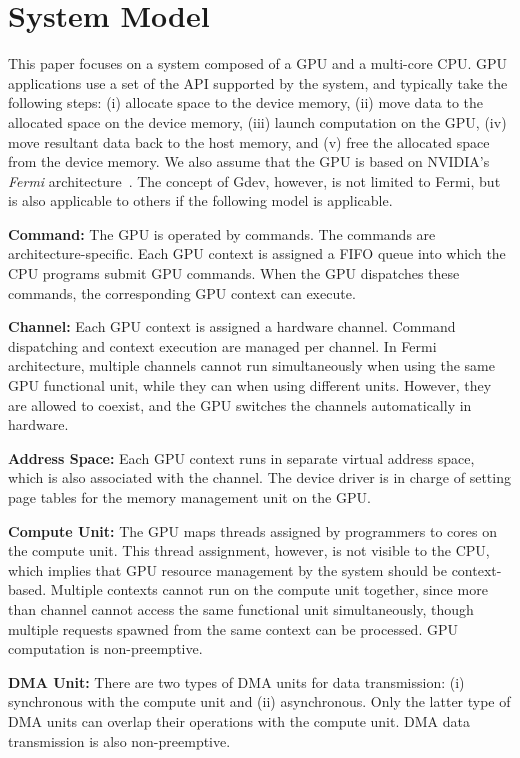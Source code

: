 \section{System Model}
\label{sec:model}
\vspace{-0.25em}

This paper focuses on a system composed of a GPU and a multi-core CPU.
GPU applications use a set of the API supported by the system, and
typically take the following steps:
(i) allocate space to the device memory, 
(ii) move data to the allocated space on the device memory, 
(iii) launch computation on the GPU, 
(iv) move resultant data back to the host memory, and 
(v) free the allocated space from the device memory.
We also assume that the GPU is based on NVIDIA's \textit{Fermi}
architecture~\cite{Fermi}.
The concept of Gdev, however, is not limited to Fermi, but is also
applicable to others if the following model is applicable.

\textbf{Command:}
The GPU is operated by commands.
The commands are architecture-specific.
Each GPU context is assigned a FIFO queue into which the CPU programs
submit GPU commands.
When the GPU dispatches these commands, the corresponding GPU context
can execute.

\textbf{Channel:}
Each GPU context is assigned a hardware channel.
Command dispatching and context execution are managed per channel.
In Fermi architecture, multiple channels cannot run simultaneously when
using the same GPU functional unit, while they can when using different
units.
However, they are allowed to coexist, and the GPU switches the channels
automatically in hardware.

\textbf{Address Space:}
Each GPU context runs in separate virtual address space, which is also
associated with the channel.
The device driver is in charge of setting page tables for the memory
management unit on the GPU.

\begin{comment}
\textbf{I/O Register:}
The GPU provides a bunch of memory-mapped I/O registers per context
visible to the device driver through the (PCI) I/O bus.
The device driver needs to manage these registers to send commands and
set up channels and address space.
\end{comment}

\textbf{Compute Unit:}
The GPU maps threads assigned by programmers to cores on the compute unit.
This thread assignment, however, is not visible to the CPU, which
implies that GPU resource management by the system should be
context-based. 
Multiple contexts cannot run on the compute unit together, since
more than channel cannot access the same functional unit simultaneously,
though multiple requests spawned from the same context can be processed.
GPU computation is non-preemptive.

\textbf{DMA Unit:}
There are two types of DMA units for data transmission: (i) synchronous
with the compute unit and (ii) asynchronous.
Only the latter type of DMA units can overlap their operations with the
compute unit.
DMA data transmission is also non-preemptive.
